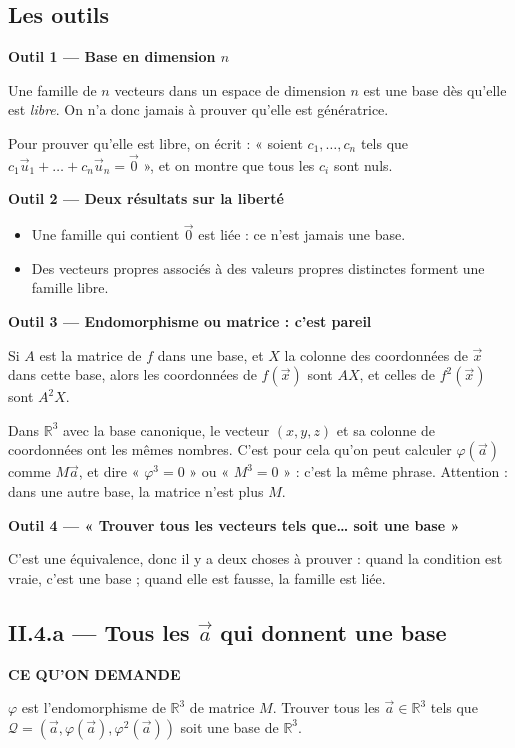 \documentclass[a4paper,11pt]{article}
\numberwithin{equation}{section}
\numberwithin{figure}{section}
\numberwithin{table}{section}
\theoremstyle{enonce}
\theoremstyle{exemple}
\theoremstyle{remarque}
\newcounter{exo}[section]
\newcommand{\R}{\mathbb{R}}
\newcommand{\va}{\vec a}\newcommand{\vb}{\vec b}\newcommand{\vz}{\vec 0}\newcommand{\dd}[1]{\vec\delta_{#1}}
\newcommand{\Qc}{\mathcal Q}
\newcommand{\Enonce}[1]{\begin{enoncebox}{\sffamily\bfseries\footnotesize\color{Bleu}CE QU'ON DEMANDE}\par\smallskip #1\end{enoncebox}}
\newcommand{\Outil}[2]{\begin{enoncebox}{\sffamily\bfseries\small\color{Bleu}#1}\par\smallskip #2\end{enoncebox}}
\begin{document}
\subsection{Les outils}\label{q:outils}

\Outil{Outil 1 — Base en dimension $n$}{%
Une famille de $n$ vecteurs dans un espace de dimension $n$ est une base dès qu'elle est \emph{libre}. On n'a donc jamais à
prouver qu'elle est génératrice.

Pour prouver qu'elle est libre, on écrit : « soient $c_1,\dots,c_n$ tels que $c_1\vec u_1+\dots+c_n\vec u_n=\vz$ », et on
montre que tous les $c_i$ sont nuls.}

\Outil{Outil 2 — Deux résultats sur la liberté}{%
\begin{itemize}[leftmargin=1.2em,itemsep=2pt]
\item Une famille qui contient $\vz$ est liée : ce n'est jamais une base.
\item Des vecteurs propres associés à des valeurs propres distinctes forment une famille libre.
\end{itemize}}

\Outil{Outil 3 — Endomorphisme ou matrice : c'est pareil}{%
Si $A$ est la matrice de $f$ dans une base, et $X$ la colonne des coordonnées de $\vec x$ dans cette base, alors les
coordonnées de $f(\vec x)$ sont $AX$, et celles de $f^2(\vec x)$ sont $A^2X$.

Dans $\R^3$ avec la base canonique, le vecteur $(x,y,z)$ et sa colonne de coordonnées ont les mêmes nombres. C'est pour cela
qu'on peut calculer $\varphi(\va)$ comme $M\va$, et dire « $\varphi^3=0$ » ou « $M^3=0$ » : c'est la même phrase.
Attention : dans une autre base, la matrice n'est plus $M$.}

\Outil{Outil 4 — « Trouver tous les vecteurs tels que… soit une base »}{%
C'est une équivalence, donc il y a deux choses à prouver : quand la condition est vraie, c'est une base ; quand elle est
fausse, la famille est liée.}

\clearpage
\subsection{II.4.a — Tous les \texorpdfstring{$\va$}{a} qui donnent une base}\label{q:ii4a}

\Enonce{$\varphi$ est l'endomorphisme de $\R^3$ de matrice $M$. Trouver tous les $\va\in\R^3$ tels que
$\Qc=(\va,\varphi(\va),\varphi^2(\va))$ soit une base de $\R^3$.}
\end{document}
